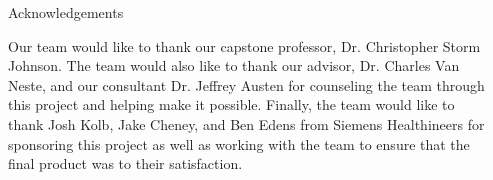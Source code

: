 \documentclass[final]{beamer}
\newlength{\sepwidth}
\newlength{\colwidth}
\newcommand{\separatorcolumn}{\begin{column}{\sepwidth}\end{column}}
\newcommand{\sectionHeading}[1]{\vskip2.0ex \textbf{#1} \vskip0.25ex}
\begin{document}
\begin{frame}[t]
\begin{columns}[t]
\begin{column}{\colwidth}

  \begin{alertblock}{Acknowledgements}

    Our team would like to thank our capstone professor, Dr. Christopher Storm Johnson. The team would also like to thank our advisor, Dr. Charles Van Neste, and our consultant Dr. Jeffrey Austen for counseling the team through this project and helping make it possible. Finally, the team would like to thank Josh Kolb, Jake Cheney, and Ben Edens from Siemens Healthineers for sponsoring this project as well as working with the team to ensure that the final product was to their satisfaction.

  \end{alertblock}

\end{column}

\separatorcolumn
\end{columns}
\end{frame}
\end{document}
